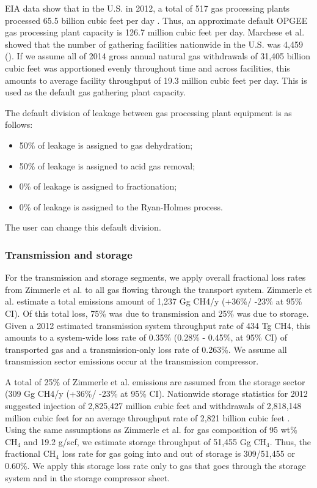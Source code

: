 \documentclass[11pt]{report}
\begin{document}
EIA data show that in the U.S. in 2012, a total of 517 gas processing plants processed 65.5 billion cubic feet per day \cite{EIA2012}. Thus, an approximate default OPGEE gas processing plant capacity is 126.7 million cubic feet per day. Marchese et al. \cite{Marchese2015} showed that the number of gathering facilities nationwide in the U.S. was 4,459 (\cite[SI Table S12]{Marchese2015}). If we assume all of 2014 gross annual natural gas withdrawals of 31,405 billion cubic feet \cite{EIA2020gas} was apportioned evenly throughout time and across facilities, this amounts to average facility throughput of 19.3 million cubic feet per day. This is used as the default gas gathering plant capacity.

The default division of leakage between gas processing plant equipment is as follows:
\begin{itemize}
\item	50\% of leakage is assigned to gas dehydration;
\item	50\% of leakage is assigned to acid gas removal;
\item	0\% of leakage is assigned to fractionation;
\item	0\% of leakage is assigned to the Ryan-Holmes process.
\end{itemize}
The user can change this default division.

\subsubsection{Transmission and storage}
For the transmission and storage segments, we apply overall fractional loss rates from Zimmerle et al. \cite{Zimmerle2015} to all gas flowing through the transport system. Zimmerle et al. estimate a total emissions amount of 1,237 Gg CH4/y (+36\%/ -23\% at 95\% CI). Of this total loss, 75\% was due to transmission and 25\% was due to storage. Given a 2012 estimated transmission system throughput rate of 434 Tg CH4, this amounts to a system-wide loss rate of 0.35\% (0.28\% - 0.45\%, at 95\% CI) of transported gas and a transmission-only loss rate of 0.263\%. We assume all transmission sector emissions occur at the transmission compressor.

A total of 25\% of Zimmerle et al. \cite{Zimmerle2015} emissions are assumed from the storage sector (309 Gg CH4/y (+36\%/ -23\% at 95\% CI). Nationwide storage statistics for 2012 suggested injection of 2,825,427 million cubic feet and withdrawals of 2,818,148 million cubic feet for an average throughput rate of 2,821 billion cubic feet \cite{EIA2012NGAnnual}. Using the same assumptions as Zimmerle et al. for gas composition of 95 wt\% CH$_4$ and 19.2 g/scf, we estimate storage throughput of 51,455 Gg CH$_4$. Thus, the fractional CH$_4$ loss rate for gas going into and out of storage is 309/51,455 or 0.60\%. We apply this storage loss rate only to gas that goes through the storage system and in the storage compressor sheet.
\end{document}
